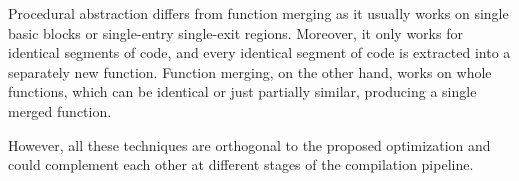 Procedural abstraction differs from function merging as it usually works on
single basic blocks or single-entry single-exit regions.
Moreover, it only works for identical segments of code, and every identical
segment of code is extracted into a separately new function.
Function merging, on the other hand, works on whole functions, which can be
identical or just partially similar, producing a single merged function.

However, all these techniques are orthogonal to the proposed optimization and
could complement each other at different stages of the compilation pipeline.
